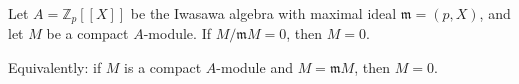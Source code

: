 Let $A = \mathbb{Z}_p[[X]]$ be the Iwasawa algebra with maximal ideal $\mathfrak{m} = (p,X)$, and let $M$ be a compact $A$-module. If $M/\mathfrak{m}M = 0$, then $M = 0$.

Equivalently: if $M$ is a compact $A$-module and $M = \mathfrak{m}M$, then $M = 0$.
